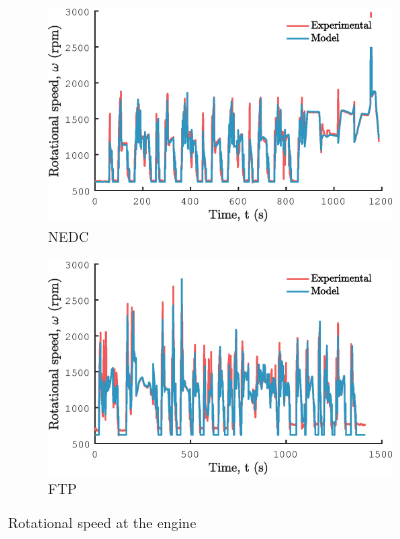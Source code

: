 \begin{figure}[ht]
  \centering
  \begin{subfigure}[b]{0.49\textwidth}
    \includegraphics[width=\textwidth]{figures/model/NEDC/w_engine.eps}
    \caption{NEDC}
    \label{fig:NEDC_w_engine}
  \end{subfigure}
  \begin{subfigure}[b]{0.49\textwidth}
    \includegraphics[width=\textwidth]{figures/model/FTP/w_engine.eps}
    \caption{FTP}
    \label{fig:FTP_w_engine}
  \end{subfigure}
  \caption{Rotational speed at the engine}\label{fig:w_engine}
\end{figure}

